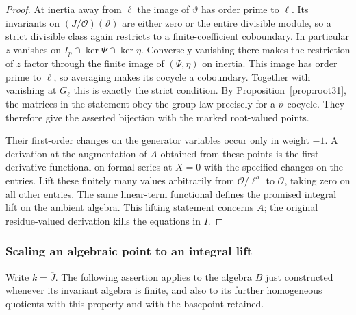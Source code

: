 \documentclass[a4paper,11pt]{article}
\theoremstyle{definition}
\theoremstyle{remark}
\numberwithin{equation}{section}
\newcommand{\OO}{\mathcal O}
\begin{document}
\begin{proof}
At inertia away from \(\ell\) the image of \(\vartheta\) has order prime to \(\ell\). Its invariants on \((J/\OO)(\vartheta)\) are either zero or the entire divisible module, so a strict divisible class again restricts to a finite-coefficient coboundary. In particular \(z\) vanishes on \(I_p\cap\ker\Psi\cap\ker\eta\). Conversely vanishing there makes the restriction of \(z\) factor through the finite image of \((\Psi,\eta)\) on inertia. This image has order prime to \(\ell\), so averaging makes its cocycle a coboundary. Together with vanishing at \(G_\ell\) this is exactly the strict condition. By Proposition~\ref{prop:root31}, the matrices in the statement obey the group law precisely for a \(\vartheta\)-cocycle. They therefore give the asserted bijection with the marked root-valued points.

Their first-order changes on the generator variables occur only in weight \(-1\). A derivation at the augmentation of \(A\) obtained from these points is the first-derivative functional on formal series at \(X=0\) with the specified changes on the entries. Lift these finitely many values arbitrarily from \(\OO/\ell^h\) to \(\OO\), taking zero on all other entries. The same linear-term functional defines the promised integral lift on the ambient algebra. This lifting statement concerns \(A\); the original residue-valued derivation kills the equations in \(I\).
\end{proof}

\subsubsection{Scaling an algebraic point to an integral lift}\label{nav:IV-10}
Write \(k=\overline J\). The following assertion applies to the algebra \(B\) just constructed whenever its invariant algebra is finite, and also to its further homogeneous quotients with this property and with the basepoint retained.
\end{document}
